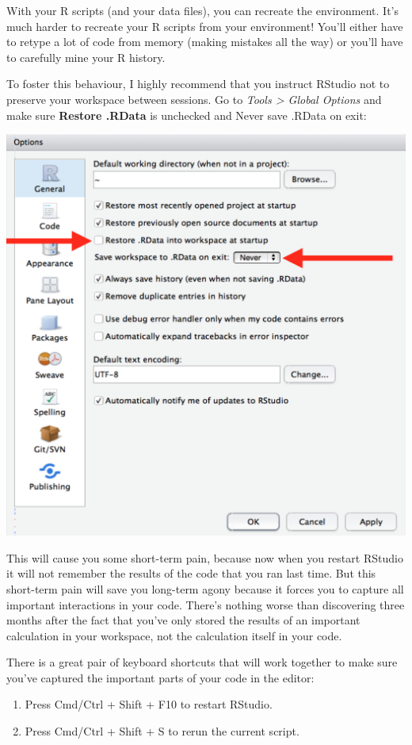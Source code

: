 \documentclass[letterpaper,12pt,twoside,]{pinp}
\providecommand{\tightlist}{%
  \setlength{\itemsep}{0pt}\setlength{\parskip}{0pt}}
\begin{document}
With your R scripts (and your data files), you can recreate the
environment. It's much harder to recreate your R scripts from your
environment! You'll either have to retype a lot of code from memory
(making mistakes all the way) or you'll have to carefully mine your R
history.

To foster this behaviour, I highly recommend that you instruct RStudio
not to preserve your workspace between sessions. Go to \emph{Tools
\textgreater{} Global Options} and make sure \textbf{Restore .RData} is
unchecked and Never save .RData on exit:

\begin{center}\includegraphics[width=0.75\linewidth]{screenshots/rstudio-workspace} \end{center}

This will cause you some short-term pain, because now when you restart
RStudio it will not remember the results of the code that you ran last
time. But this short-term pain will save you long-term agony because it
forces you to capture all important interactions in your code. There's
nothing worse than discovering three months after the fact that you've
only stored the results of an important calculation in your workspace,
not the calculation itself in your code.

There is a great pair of keyboard shortcuts that will work together to
make sure you've captured the important parts of your code in the
editor:

\begin{enumerate}
\def\labelenumi{\arabic{enumi}.}
\tightlist
\item
  Press Cmd/Ctrl + Shift + F10 to restart RStudio.
\item
  Press Cmd/Ctrl + Shift + S to rerun the current script.
\end{enumerate}
\end{document}
